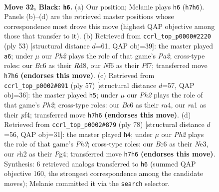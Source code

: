 \documentclass[11pt]{article}
\begin{document}
\clearpage

\begin{figure}[p]\centering
\begin{subfigure}{0.46\textwidth}\centering
\resizebox{\linewidth}{!}{%
\newchessgame
\chessboard[
  setfen={4r1k1/p1b3pp/P1b2n2/1p3p2/5P2/1P2P1P1/7R/RNB3K1 b - - 1 32},
  showmover=false,
  pgfstyle=straightmove, color=movearrow, markmove={h7-h6}
]}
\caption{}
\end{subfigure}\hfill
\begin{subfigure}{0.46\textwidth}\centering
\resizebox{\linewidth}{!}{%
\newchessgame
\chessboard[
  setfen={3r4/ppb1kpp1/4p3/P4n1p/1PP5/5PP1/2N1KB1P/1R6 b - - 4 27},
  showmover=false,
  pgfstyle=straightmove, color=movearrow, markmove={a7-a6}
]}
\caption{}
\end{subfigure}
\\[4pt]
\begin{subfigure}{0.46\textwidth}\centering
\resizebox{\linewidth}{!}{%
\newchessgame
\chessboard[
  setfen={1r4k1/2pb2pp/2np4/2p5/R4PP1/1P5P/2P5/3BB1K1 b - - 0 29},
  showmover=false,
  pgfstyle=straightmove, color=movearrow, markmove={h7-h5}
]}
\caption{}
\end{subfigure}\hfill
\begin{subfigure}{0.46\textwidth}\centering
\resizebox{\linewidth}{!}{%
\newchessgame
\chessboard[
  setfen={4r3/5pk1/6p1/1pr5/4p1P1/pP2N2P/P3K3/1B3R2 w - - 0 40},
  showmover=false,
  pgfstyle=straightmove, color=movearrow, markmove={h3-h4}
]}
\caption{}
\end{subfigure}
\caption{\textbf{Move 32, Black: \texttt{h6}.} (a) Our position; Melanie plays \texttt{h6} (\texttt{h7h6}). Panels (b)--(d) are the retrieved master positions whose correspondence most drove this move (highest QAP objective among those that transfer to it). (b) Retrieved from \texttt{ccrl\_top\_p0000\#2220} (ply 53) [structural distance $d$=61, QAP obj=39]: the master played \texttt{a6}; under $\mu$ our \emph{Ph2} plays the role of that game's \emph{Pa2}; cross-type roles: our \emph{B}c6 as their \emph{R}d8, our \emph{N}f6 as their \emph{P}f7; transferred move \texttt{h7h6} \textbf{(endorses this move)}. (c) Retrieved from \texttt{ccrl\_top\_p0002\#891} (ply 57) [structural distance $d$=57, QAP obj=36]: the master played \texttt{h5}; under $\mu$ our \emph{Ph2} plays the role of that game's \emph{Ph2}; cross-type roles: our \emph{B}c6 as their \emph{r}a4, our \emph{r}a1 as their \emph{p}f4; transferred move \texttt{h7h6} \textbf{(endorses this move)}. (d) Retrieved from \texttt{ccrl\_top\_p0002\#879} (ply 78) [structural distance $d$=56, QAP obj=31]: the master played \texttt{h4}; under $\mu$ our \emph{Ph2} plays the role of that game's \emph{Ph3}; cross-type roles: our \emph{B}c6 as their \emph{N}e3, our \emph{r}h2 as their \emph{P}g4; transferred move \texttt{h7h6} \textbf{(endorses this move)}. Synthesis: 6 retrieved analogs transferred to \texttt{h6} (summed QAP objective 160, the strongest correspondence among the candidate moves); Melanie committed it via the \texttt{search} selector.}
\label{fig:thought-m63}
\end{figure}
\end{document}
